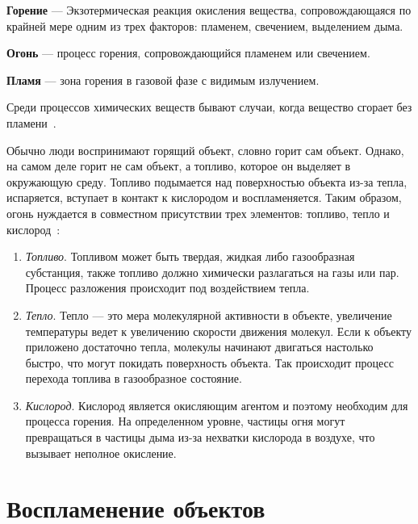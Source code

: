 \textbf{Горение} --- Экзотермическая реакция окисления вещества, сопровождающаяся по крайней мере
одним из трех факторов: пламенем, свечением, выделением дыма.

\textbf{Огонь} --- процесс горения, сопровождающийся пламенем или свечением.

\textbf{Пламя} --- зона горения в газовой фазе с видимым излучением.

Среди процессов химических веществ бывают случаи, когда вещество сгорает без
пламени~\cite{WikiFire}.

Обычно люди воспринимают горящий объект, словно горит сам объект. Однако, на
самом деле горит не сам объект, а топливо, которое он выделяет в окружающую
среду. Топливо подымается над поверхностью объекта из-за тепла, испаряется,
вступает в контакт к кислородом и воспламеняется. Таким образом, огонь нуждается
в совместном присутствии трех элементов: топливо, тепло и
кислород~\cite{USArmy}:
\begin{enumerate}
    \item \emph{Топливо}. Топливом может быть твердая, жидкая либо газообразная
        субстанция, также топливо должно химически разлагаться на газы или
        пар. Процесс разложения происходит под воздействием тепла.
    \item \emph{Тепло}. Тепло --- это мера молекулярной активности в объекте,
        увеличение температуры ведет к увеличению скорости движения молекул.
        Если к объекту приложено достаточно тепла, молекулы начинают двигаться
        настолько быстро, что могут покидать поверхность объекта. Так происходит
        процесс перехода топлива в газообразное состояние.
    \item \emph{Кислород}. Кислород является окисляющим агентом и поэтому
        необходим для процесса горения. На определенном уровне, частицы огня
        могут превращаться в частицы дыма из-за нехватки кислорода в воздухе,
        что вызывает неполное окисление.
\end{enumerate}

\section{Воспламенение объектов}

